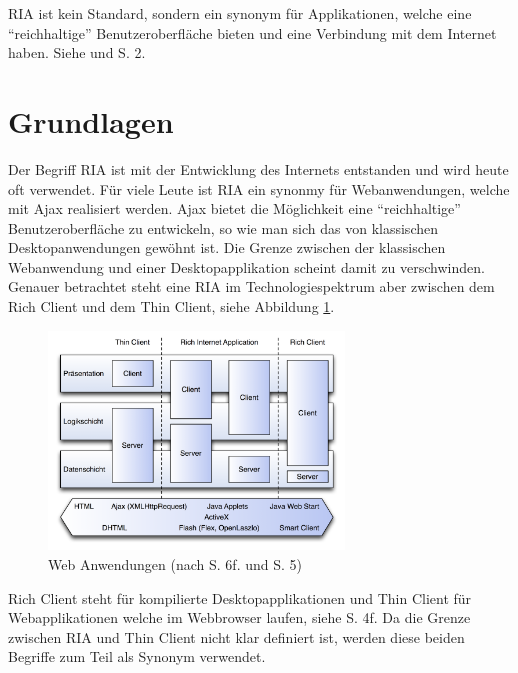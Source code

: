   \ac{RIA} ist kein Standard, sondern ein synonym für Applikationen, welche
  eine ``reichhaltige'' Benutzeroberfläche bieten und eine Verbindung mit dem
  Internet haben. Siehe \cite{RichInternetApplication} und
  \cite{RichInternetApplicationsWhitePaper} S. 2.
  
  \section{Grundlagen}
  
  Der Begriff \ac{RIA} ist mit der Entwicklung des Internets entstanden und
  wird heute oft verwendet. Für viele Leute ist \ac{RIA} ein synonmy für
  Webanwendungen, welche mit \ac{Ajax} realisiert werden. \ac{Ajax} bietet die
  Möglichkeit eine ``reichhaltige'' Benutzeroberfläche zu entwickeln, so wie
  man sich das von klassischen Desktopanwendungen gewöhnt ist. Die Grenze
  zwischen der klassischen Webanwendung und einer Desktopapplikation scheint
  damit zu verschwinden. Genauer betrachtet steht eine \ac{RIA} im
  Technologiespektrum aber zwischen dem Rich Client und dem Thin Client, siehe
  Abbildung \ref{img:webanwendungen}.
  
  \begin{figure}[h]
    \begin{center}
      \includegraphics[width=0.7\textwidth]{./image/webanwendungen.png}
      \caption{Web Anwendungen (nach \cite{DiplomarbeitStephanSchuster} S. 6f.
      und \cite{WebApplicationSolutions} S. 5)}
      \label{img:webanwendungen}
    \end{center}
  \end{figure}
  
  Rich Client steht für kompilierte Desktopapplikationen und Thin Client für
  Webapplikationen welche im Webbrowser laufen, siehe
  \cite{WebApplicationSolutions} S. 4f. Da die Grenze zwischen \ac{RIA} und
  Thin Client nicht klar definiert ist, werden diese beiden Begriffe zum Teil
  als Synonym verwendet.
  

